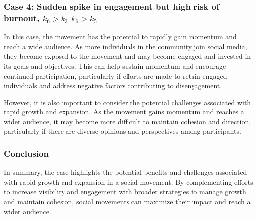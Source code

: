 \documentclass{article}
\begin{document}
    \subsubsection*{Case 4: Sudden spike in engagement but high risk of burnout, $k_6 > k_3$  $k_6 > k_5$}
    \begin{tcolorbox}
   In this case, the movement has the potential to rapidly gain momentum and reach a wide audience. As more individuals in the community join social media, they become exposed to the movement and may become engaged and invested in its goals and objectives. This can help sustain momentum and encourage continued participation, particularly if efforts are made to retain engaged individuals and address negative factors contributing to disengagement. 
   
   However, it is also important to consider the potential challenges associated with rapid growth and expansion. As the movement gains momentum and reaches a wider audience, it may become more difficult to maintain cohesion and direction, particularly if there are diverse opinions and perspectives among participants.
    \subsubsection*{Conclusion} In summary,  the case highlights the potential benefits and challenges associated with rapid growth and expansion in a social movement. By complementing efforts to increase visibility and engagement with broader strategies to manage growth and maintain cohesion, social movements can maximize their impact and reach a wider audience.
    \end{tcolorbox}
\end{document}
